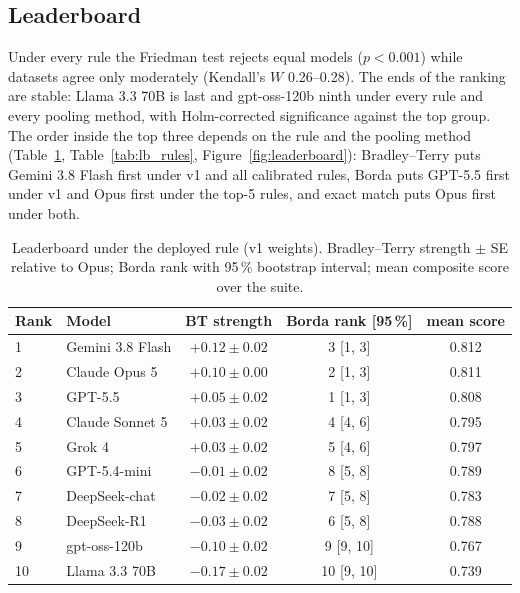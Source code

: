 \documentclass[11pt]{article}
\begin{document}
\subsection{Leaderboard}
Under every rule the Friedman test rejects equal models ($p<0.001$) while datasets agree only moderately (Kendall's $W$ 0.26--0.28). The ends of the ranking are stable: Llama 3.3 70B is last and gpt-oss-120b ninth under every rule and every pooling method, with Holm-corrected significance against the top group. The order inside the top three depends on the rule and the pooling method (Table~\ref{tab:lb_v1}, Table~\ref{tab:lb_rules}, Figure~\ref{fig:leaderboard}): Bradley--Terry puts Gemini 3.8 Flash first under v1 and all calibrated rules, Borda puts GPT-5.5 first under v1 and Opus first under the top-5 rules, and exact match puts Opus first under both.

\begin{table}[htbp]
\centering\small
\caption{Leaderboard under the deployed rule (v1 weights). Bradley--Terry strength $\pm$ SE relative to Opus; Borda rank with 95\,\% bootstrap interval; mean composite score over the suite.}
\label{tab:lb_v1}
\begin{tabular}{llccc}
\toprule
Rank & Model & BT strength & Borda rank [95\,\%] & mean score \\
\midrule
1 & Gemini 3.8 Flash & $+0.12 \pm 0.02$ & 3 [1, 3] & 0.812 \\
2 & Claude Opus 5    & $+0.10 \pm 0.00$ & 2 [1, 3] & 0.811 \\
3 & GPT-5.5          & $+0.05 \pm 0.02$ & 1 [1, 3] & 0.808 \\
4 & Claude Sonnet 5  & $+0.03 \pm 0.02$ & 4 [4, 6] & 0.795 \\
5 & Grok 4           & $+0.03 \pm 0.02$ & 5 [4, 6] & 0.797 \\
6 & GPT-5.4-mini     & $-0.01 \pm 0.02$ & 8 [5, 8] & 0.789 \\
7 & DeepSeek-chat    & $-0.02 \pm 0.02$ & 7 [5, 8] & 0.783 \\
8 & DeepSeek-R1      & $-0.03 \pm 0.02$ & 6 [5, 8] & 0.788 \\
9 & gpt-oss-120b     & $-0.10 \pm 0.02$ & 9 [9, 10] & 0.767 \\
10 & Llama 3.3 70B   & $-0.17 \pm 0.02$ & 10 [9, 10] & 0.739 \\
\bottomrule
\end{tabular}
\end{table}
\end{document}
